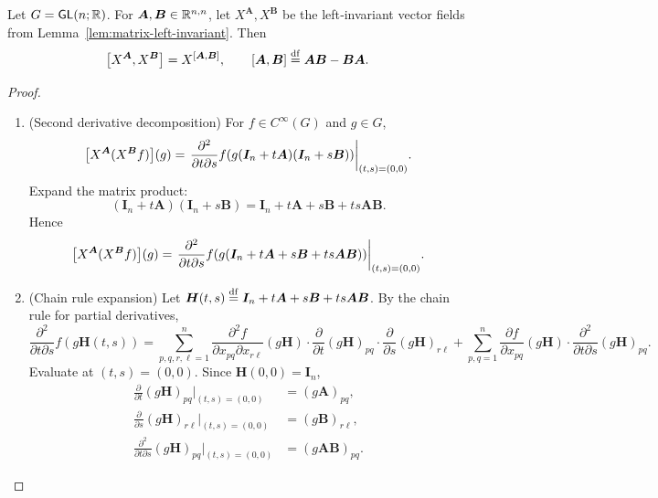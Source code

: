 \documentclass[11pt,reqno]{amsart}
\begin{document}
\begin{lemma}\label{lem:matrix-commutator}
  Let $G=\operatorname{\mathsf{GL}}(n;\mathbb{R})$.  For $\bm A,\bm B\in\mathbb{R}^{n,n}$,
  let $X^{\bm A},X^{\bm B}$ be the left‑invariant vector fields from
  Lemma~\ref{lem:matrix-left-invariant}.  Then
  \[
    \SqBr{X^{\bm A}, X^{\bm B}} = X^{\SqBr{\bm A,\bm B}},
    \qquad
    \SqBr{\bm A,\bm B}\df\bm A\bm B - \bm B\bm A.
  \]
\end{lemma}
\begin{proof}
  \begin{enumerate}
  \item (Second derivative decomposition)
  For $f\in C^\infty(G)$ and $g\in G$,
  \[
    \FUNC{X^{\bm A}(X^{\bm B}f)}{g}
    =\eval{\frac{\partial^2}{\partial t\partial s}
      f\Br{g(\bm I_n + t\bm A)(\bm I_n + s\bm B)}}_{(t,s)=(0,0)}.
  \]
  Expand the matrix product:
  \[
    (\bm I_n + t\bm A)(\bm I_n + s\bm B)
    =\bm I_n + t\bm A + s\bm B + ts\bm A\bm B.
  \]
  Hence
  \[
    \FUNC{X^{\bm A}(X^{\bm B}f)}{g}
    =\eval{\frac{\partial^2}{\partial t\partial s}
      f\Br{g\Br{\bm I_n + t\bm A + s\bm B + ts\bm A\bm B}}}_{(t,s)=(0,0)}.
  \]

  \item (Chain rule expansion)
  Let $\bm H(t,s)\stackrel{\mathrm{df}}{=}\bm I_n + t\bm A + s\bm B + ts\bm A\bm B$.
  By the chain rule for partial derivatives,
  \[
    \frac{\partial^2}{\partial t\partial s}
    f(g\bm H(t,s))
    =\sum_{p,q,r,\ell=1}^n
    \frac{\partial^2 f}{\partial x_{pq}\partial x_{r\ell}}(g\bm H)
    \cdot\frac{\partial}{\partial t}(g\bm H)_{pq}
    \cdot\frac{\partial}{\partial s}(g\bm H)_{r\ell}
    +\sum_{p,q=1}^n
    \frac{\partial f}{\partial x_{pq}}(g\bm H)
    \cdot\frac{\partial^2}{\partial t\partial s}(g\bm H)_{pq}.
  \]
  Evaluate at $(t,s)=(0,0)$.  Since $\bm H(0,0)=\bm I_n$,
  \[
    \begin{aligned}
    \frac{\partial}{\partial t}(g\bm H)_{pq}\Big|_{(t,s)=(0,0)} &= (g\bm A)_{pq}, \\
    \frac{\partial}{\partial s}(g\bm H)_{r\ell}\Big|_{(t,s)=(0,0)} &= (g\bm B)_{r\ell}, \\
    \frac{\partial^2}{\partial t\partial s}(g\bm H)_{pq}\Big|_{(t,s)=(0,0)} &= (g\bm A\bm B)_{pq}.
    \end{aligned}
  \]


\end{enumerate}
\end{proof}
\end{document}
